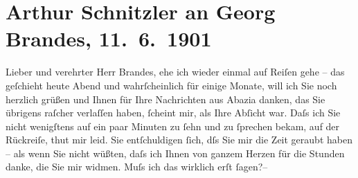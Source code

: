 

         
         \renewcommand{\erwaehntePersonen}{Personen: Richard Beer-Hofmann, Georg Brandes, Fjodor Mihajlovič Dostojevskij, Édouard Dujardin}
         \renewcommand{\erwaehnteOrte}{Orte: Hotel Guarnero, Salzburg, Villa Arnstein, Wien, Wörthersee}
         \renewcommand{\erwaehnteWerke}{Werke: Der einsame Weg. Schauspiel in fünf Akten, Die Sanfte, Les lauriers sont coupés, Lieutenant Gustl. Novelle}
               \section[Arthur Schnitzler an Georg Brandes, 11. 6. 1901]{ Arthur Schnitzler an Georg Brandes, 11. 6. 1901}\nopagebreak{}\rehead{ }\begin{ledgroupsized}[t]{13cm}\normalsize\beginnumbering{} \toendnotes[C]{\smallbreak\pagebreak[2]} 
\toendnotes[C]{\smallbreak}\pstart{}{\pb}Lieber und verehrter Herr Brandes,\pend\pstart
           ehe ich wieder einmal auf Reiſen gehe – das geſchieht heute Abend und wahrſcheinlich
               für einige Monate, will ich Sie noch herzlich grüßen und Ihnen für Ihre Nachrichten
               aus Abazia danken, das Sie übrigens raſcher
               verlaſſen haben, ſcheint mir, als Ihre Abſicht war. Daſs ich Sie {\pb}nicht wenigſtens auf ein paar Minuten zu ſehn und
               zu ſprechen bekam, auf der Rückreiſe, thut mir leid. Sie entſchuldigen ſich, dſs Sie
               mir die Zeit geraubt haben – als wenn Sie nicht wüßten, daſs ich Ihnen von ganzem
               Herzen für die Stunden danke, die Sie mir widmen. Muſs ich das wirklich erſt ſagen?–

\end{ledgroupsized}

